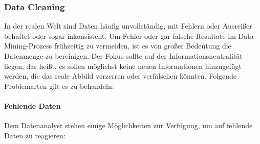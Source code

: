 \subsubsection{Data Cleaning}
\label{dc}
In der realen Welt sind Daten häufig \glqq unvollständig, mit Fehlern oder Ausreißer behaftet oder sogar inkonsistent.\grqq{} Um Fehler oder gar falsche Resultate im Data-Mining-Prozess frühzeitig zu vermeiden, ist es von großer Bedeutung die Datenmenge zu bereinigen. Der Fokus sollte auf der Informationsneutralität liegen, das heißt, es sollen möglichst keine neuen Informationen hinzugefügt werden, die das reale Abbild verzerren oder verfälschen könnten. Folgende Problemarten gilt es zu behandeln:

\paragraph{Fehlende Daten} 
Dem Datenanalyst stehen einige Möglichkeiten zur Verfügung, um auf fehlende Daten zu reagieren:

